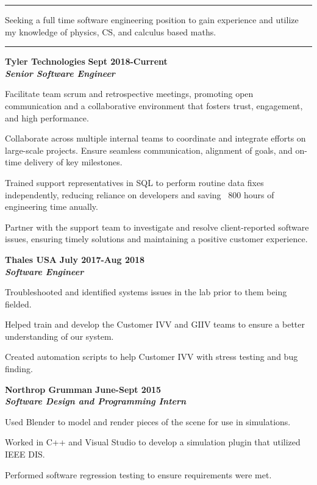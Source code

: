 \documentclass[10pt]{article}
\newcommand{\thing}[1][]{\item #1}
\newcommand{\sectionheader}[1]{
    \vspace{3pt}
    \StrSplit{#1}{3}{\firstpart}{\lastpart} %

    \makebox[0pt][l]{\textbf{\LARGE\firstpart\lastpart}}%
    \rule[-1ex]{\columnwidth}{.1pt}

}
\newcommand{\dates}[2]{
    \textbf{#1-#2}
}
\begin{document}
    \sectionheader{Objective}
    Seeking a full time software engineering position to gain 
    experience and utilize my knowledge of physics, CS, 
    and calculus based maths.
    
    \sectionheader{Experience}
    \textbf{\large Tyler Technologies} \hfill \dates{Sept 2018}{Current}\\
    \textit{\textbf{Senior Software Engineer}}
    \begin{things}
        \thing Facilitate team scrum and retrospective meetings, promoting open communication
                    and a collaborative environment that fosters trust, engagement, and high performance.
        \thing Collaborate across multiple internal teams to coordinate and integrate efforts
                    on large-scale projects. Ensure seamless communication, alignment of goals,
                    and on-time delivery of key milestones.
        \thing Trained support representatives in SQL to perform routine data fixes independently,
                    reducing reliance on developers and saving ~800 hours of engineering time anually.
        \thing Partner with the support team to investigate and resolve client-reported software
                    issues, ensuring timely solutions and maintaining a positive customer experience.
    \end{things}

    \textbf{\large Thales USA} \hfill \dates{July 2017}{Aug 2018}\\
    \textit{\textbf{Software Engineer}}
    \begin{things}
        \thing Troubleshooted and identified systems issues in 
                    the lab prior to them being fielded.
        \thing Helped train and develop the Customer IVV and 
                    GIIV teams to ensure a better understanding of our system.
        \thing Created automation scripts to help Customer IVV
                with stress testing and bug finding.
    \end{things}

    \textbf{\large Northrop Grumman} \hfill \dates{June}{Sept 2015}\\
    \textit{\textbf{Software Design and Programming Intern}}
    \begin{things}
        \thing Used Blender to model and render pieces of the scene
                for use in simulations.
        \thing Worked in C++ and Visual Studio to develop a simulation
                plugin that utilized IEEE DIS.
        \thing Performed software regression testing to ensure requirements
                were met.
    \end{things}
\end{document}
